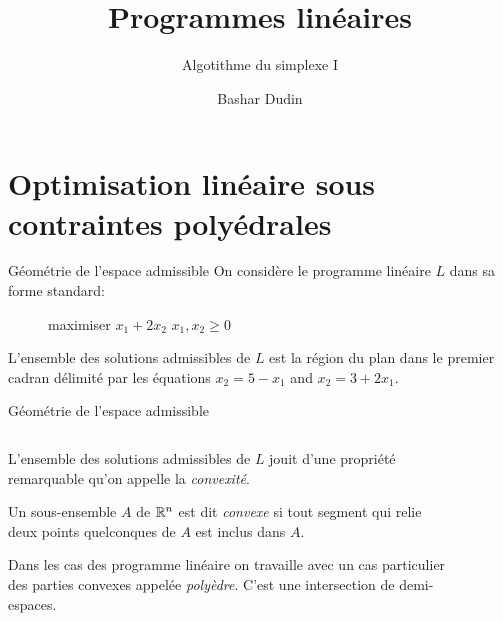 \documentclass[aspectratio = 169]{beamer}
\author[BD]{Bashar Dudin}
\institute[]{EPITA}
\title{Programmes linéaires} %
\subtitle{Algotithme du simplexe I}
\begin{document}
\begin{frame}[plain]
\titlepage %
\end{frame}

\section{Optimisation linéaire sous contraintes polyédrales}

\begin{frame}{Géométrie de l'espace admissible}
  On considère le programme linéaire $L$ dans sa forme standard:
    \begin{figure}
        \begin{linearProg}{
            maximiser
            }{
            $x_1 + 2x_2$
            }{
            }{
            $x_1, x_2 \geq 0$
            }
        \end{linearProg}
    \end{figure}
    L'ensemble des solutions admissibles de $L$ est la région du plan
    dans le premier cadran délimité par les équations $x_2 = 5 - x_1$
    and $x_2 = 3 + 2x_1$.
\end{frame}

\begin{frame}{Géométrie de l'espace admissible}
  \begin{columns}
    \begin{column}{.5\textwidth}
      L'ensemble des solutions admissibles de $L$ jouit d'une
      propriété remarquable qu'on appelle la \textit{convexité}.
      \pause
      \begin{defn}
        Un sous-ensemble $A$ de $\mathbb{R}^n$ est dit \emph{convexe} si tout
        segment qui relie deux points quelconques de $A$ est inclus
        dans $A$.
      \end{defn}
      \pause
      Dans les cas des programme linéaire on travaille avec un cas
      particulier des parties convexes appelée \emph{polyèdre}. C'est
      une intersection de demi-espaces.
    \end{column}
    \begin{column}{.6\textwidth}
      \begin{figure}
      \end{figure}
    \end{column}
  \end{columns}
\end{frame}
\end{document}

